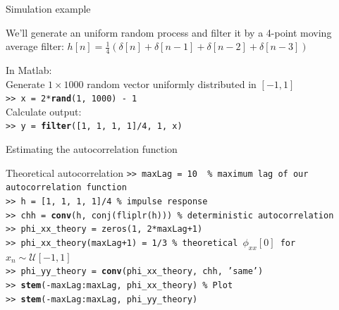\documentclass[10pt]{beamer}
\begin{document}
\begin{frame}{Simulation example}

We'll generate an uniform random process and filter it by a 4-point moving average filter: $h[n] = \frac{1}{4}(\delta[n] + \delta[n-1] + \delta[n-2] + \delta[n-3])$

\begin{center}
\end{center}
In Matlab:\\
Generate $1\times 1000$ random vector uniformly distributed in $[-1, 1]$ \\
\texttt{>> x = 2*\textbf{rand}(1, 1000) - 1} \\
Calculate output:\\
\texttt{>> y = \textbf{filter}([1, 1, 1, 1]/4, 1, x)}\\
	
\end{frame}

\begin{frame}{Estimating the autocorrelation function}
\begin{block}{Theoretical autocorrelation} 
	\texttt{>> maxLag = 10 {\color{matlabcomment} \% maximum lag of our autocorrelation function}}\\
	\texttt{>> h = [1, 1, 1, 1]/4 {\color{matlabcomment}\% impulse response}} \\
	\texttt{>> chh = \textbf{conv}(h, conj(fliplr(h))) {\color{matlabcomment}\% deterministic autocorrelation}} \\
	\texttt{>> phi\_xx\_theory = zeros(1, 2*maxLag+1)} \\
	\texttt{>> phi\_xx\_theory(maxLag+1) = 1/3 {\color{matlabcomment}\% theoretical $\phi_{xx}[0]$ for $x_n\sim\mathcal{U}[-1, 1]$}} \\
	\texttt{>> phi\_yy\_theory = \textbf{conv}(phi\_xx\_theory, chh, 'same')} \\
	\texttt{>> \textbf{stem}(-maxLag:maxLag, phi\_xx\_theory) {\color{matlabcomment}\% Plot}} \\
	\texttt{>> \textbf{stem}(-maxLag:maxLag, phi\_yy\_theory)}
\end{block}
\end{frame}
\end{document}
